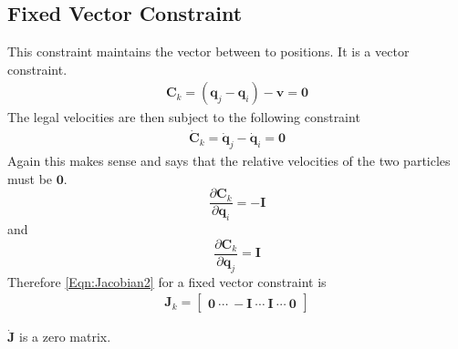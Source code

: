 \subsection{Fixed Vector Constraint}
\label{SubSec:FixedVectorConstraint}
This constraint maintains the vector between to positions. It is a vector
constraint. 
\begin{eqnarray}
	\label{Eqn:FixedVectorConstraint}
	\mathbf{C}_k = (\mathbf{q}_j - \mathbf{q}_i) - \mathbf{v} = \mathbf{0} 
\end{eqnarray}
The legal velocities are then subject to the following constraint 
\begin{eqnarray}
	\label{Eqn:FixedVectorConVel}
	\dot{\mathbf{C}}_k = \dot{\mathbf{q}}_j - \dot{\mathbf{q}}_i = \mathbf{0} 
\end{eqnarray}
Again this makes sense and says that the relative velocities of the two
particles must be $\mathbf{0}$.
\begin{equation}
	\label{Eqn:FixedVectorConstraint1}
	\frac{\partial \mathbf{C}_k}{\partial \mathbf{q}_i} = -\mathbf{I}
\end{equation}
and
\begin{equation}
	\label{Eqn:FixedVectorConstraint2}
	\frac{\partial \mathbf{C}_k}{\partial \mathbf{q}_j} = \mathbf{I}
\end{equation}
Therefore \ref{Eqn:Jacobian2} for a fixed vector constraint is
\begin{eqnarray}
	\label{Eqn:JacobianFixedVectorConstraint}
	\mathbf{J}_k = 
	\begin{bmatrix}
		\mathbf{0} \: \cdots \: -\mathbf{I} \: \cdots \: \mathbf{I} \: \cdots \: \mathbf{0}
	\end{bmatrix}
\end{eqnarray}

$\dot{\mathbf{J}}$ is a zero matrix.

